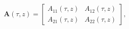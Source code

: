 \[\mathbf{A}(\tau,z)=\begin{bmatrix}A_{11}(\tau,z)&A_{12}(\tau,z)\\
A_{21}(\tau,z)&A_{22}(\tau,z)\end{bmatrix},\]